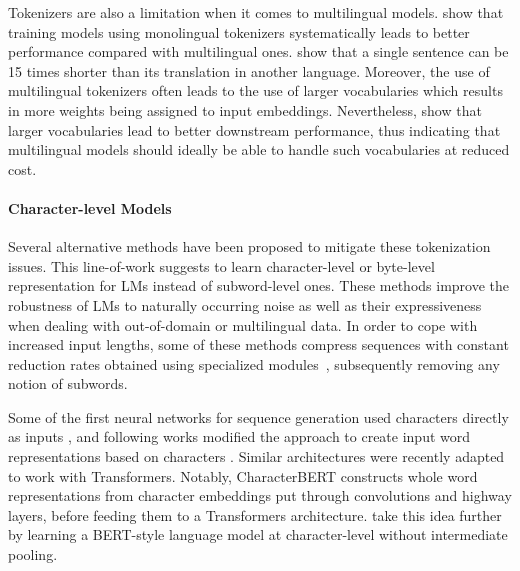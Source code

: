 Tokenizers are also a limitation when it comes to multilingual models. \citet{rust-etal-2021-good} show that training models using monolingual tokenizers systematically leads to better performance compared with multilingual ones. \citet{NEURIPS2023_74bb24dc} show that a single sentence can be 15 times shorter than its translation in another language. Moreover, the use of multilingual tokenizers often leads to the use of larger vocabularies which results in more weights being assigned to input embeddings. Nevertheless, \citet{liang2023xlmv} show that larger vocabularies lead to better downstream performance, thus indicating that multilingual models should ideally be able to handle such vocabularies at reduced cost.

\paragraph*{Character-level Models} Several alternative methods have been proposed to mitigate these tokenization issues.
This line-of-work suggests to learn character-level or byte-level representation for LMs instead of subword-level ones. These methods improve the robustness of LMs to naturally occurring noise as well as their expressiveness when dealing with out-of-domain or multilingual data. In order to cope with increased input lengths, some of these methods compress sequences with constant reduction rates obtained using specialized modules~\cite{clark2022canine,tay2021charformer}, subsequently removing any notion of subwords.

Some of the first neural networks for sequence generation used characters directly as inputs \citep{sutskever2011generating,graves2013generating}, and following works modified the approach to create input word representations based on characters \citep{kim2016character,Jzefowicz2016ExploringTL,peters-etal-2018-deep}. Similar architectures were recently adapted to work with Transformers. Notably, CharacterBERT \citep{el-boukkouri-etal-2020-characterbert} constructs whole word representations from character embeddings put through convolutions and highway layers, before feeding them to a Transformers architecture. \citet{ma-etal-2020-charbert} take this idea further by learning a BERT-style language model at character-level without intermediate pooling. 

